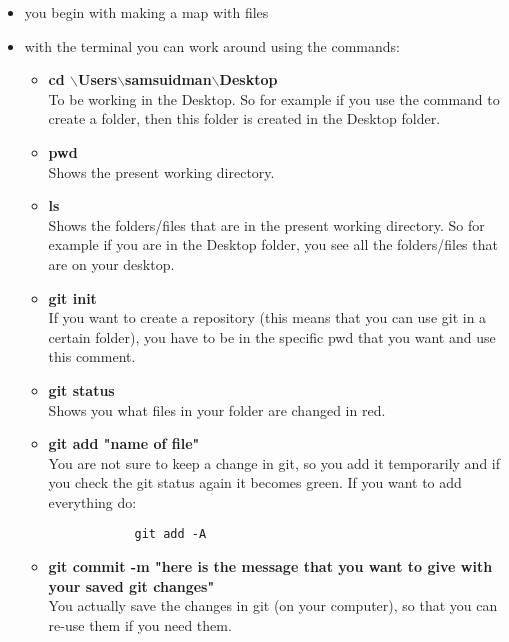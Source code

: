\documentclass{article}
\begin{document}
\begin{itemize}
    \item you begin with making a map with files
    \item with the terminal you can work around using the commands: \\
    \begin{itemize}    
        \item \textbf{cd  $\backslash$Users$\backslash$samsuidman$\backslash$Desktop} \\
        To be working in the Desktop. So for example if you use the command to create a folder, then this folder is created in the Desktop folder. \\
        
        \item \textbf{pwd} \\
        Shows the present working directory. \\
        
        \item \textbf{ls} \\
        Shows the folders/files that are in the present working directory. So for example if you are in the Desktop folder, you see all the folders/files that are on your desktop. \\
        
        \item \textbf{git init} \\
        If you want to create a repository (this means that you can use git in a certain folder), you have to be in the specific pwd that you want and use this comment. \\
        
        \item \textbf{git status} \\
        Shows you what files in your folder are changed in red. \\
        
        \item \textbf{git add "name of file"} \\
        You are not sure to keep a change in git, so you add it temporarily and if you check the git status again it becomes green. If you want to add everything do:
        \begin{verbatim}
            git add -A
        \end{verbatim}
        
        \item \textbf{git commit -m "here is the message that you want to give with your saved git changes"} \\
        You actually save the changes in git (on your computer), so that you can re-use them if you need them.
        

\end{itemize}
\end{itemize}
\end{document}
